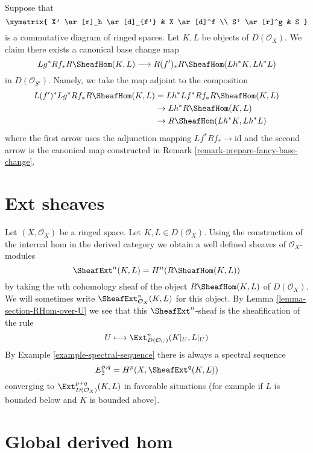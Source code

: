 \begin{remark}
\label{remark-fancy-base-change}
Suppose that
$$
\xymatrix{
X' \ar[r]_h \ar[d]_{f'} &
X \ar[d]^f \\
S' \ar[r]^g &
S
}
$$
is a commutative diagram of ringed spaces. Let $K, L$ be objects
of $D(\mathcal{O}_X)$. We claim there exists a canonical base change
map
$$
Lg^*Rf_*R\SheafHom(K, L)
\longrightarrow
R(f')_*R\SheafHom(Lh^*K, Lh^*L)
$$
in $D(\mathcal{O}_{S'})$. Namely, we take the map adjoint to
the composition
\begin{align*}
L(f')^*Lg^*Rf_*R\SheafHom(K, L)
& =
Lh^*Lf^*Rf_*R\SheafHom(K, L) \\
& \to
Lh^*R\SheafHom(K, L) \\
& \to
R\SheafHom(Lh^*K, Lh^*L)
\end{align*}
where the first arrow uses the adjunction mapping
$Lf^*Rf_* \to \text{id}$ and the second arrow is the canonical map
constructed in Remark \ref{remark-prepare-fancy-base-change}.
\end{remark}





\section{Ext sheaves}
\label{section-ext}

\noindent
Let $(X, \mathcal{O}_X)$ be a ringed space. Let $K, L \in D(\mathcal{O}_X)$.
Using the construction of the internal hom in the derived category we
obtain a well defined sheaves of $\mathcal{O}_X$-modules
$$
\SheafExt^n(K, L) = H^n(R\SheafHom(K, L))
$$
by taking the $n$th cohomology sheaf of the object $R\SheafHom(K, L)$
of $D(\mathcal{O}_X)$. We will sometimes write
$\SheafExt^n_{\mathcal{O}_X}(K, L)$ for this object.
By Lemma \ref{lemma-section-RHom-over-U}
we see that this $\SheafExt^n$-sheaf
is the sheafification of the rule
$$
U \longmapsto \Ext^n_{D(\mathcal{O}_U)}(K|_U, L|_U)
$$
By Example \ref{example-spectral-sequence} there is always a spectral
sequence
$$
E_2^{p, q} = H^p(X, \SheafExt^q(K, L))
$$
converging to $\Ext^{p + q}_{D(\mathcal{O}_X)}(K, L)$
in favorable situations (for example if $L$ is bounded below and
$K$ is bounded above).





\section{Global derived hom}
\label{section-global-RHom}

